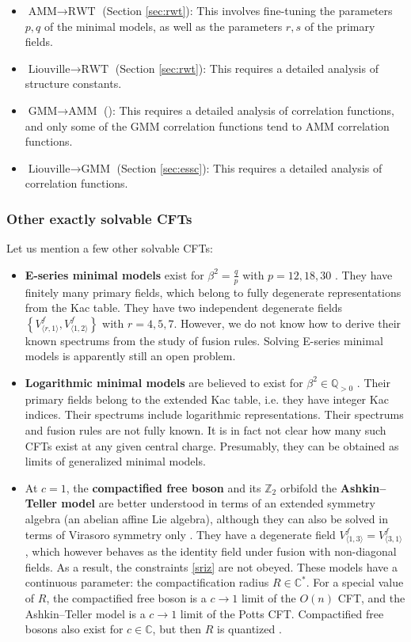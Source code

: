 \documentclass[12pt, a4paper]{article}
\theoremstyle{break}
\begin{document}
\begin{itemize}
 \item $\boxed{\text{AMM}\to \text{RWT}}$ (Section \ref{sec:rwt}): This involves fine-tuning the parameters $p,q$ of the minimal models, as well as the parameters $r,s$ of the primary fields.
  \item $\boxed{\text{Liouville}\to \text{RWT}}$ (Section \ref{sec:rwt}): This requires a detailed analysis of structure constants. 
 \item $\boxed{\text{GMM}\to \text{AMM}}$ (\cite{rib18}): This requires a detailed analysis of correlation functions, and only some of the GMM correlation functions tend to AMM correlation functions. 
 \item $\boxed{\text{Liouville}\to \text{GMM}}$ (Section \ref{sec:essc}): This requires a detailed analysis of correlation functions.
\end{itemize}

\subsubsection{Other exactly solvable CFTs}

Let us mention a few other solvable CFTs:
\begin{itemize}
 \item \textbf{E-series minimal models} exist for $\beta^2=\frac{q}{p}$ with $p=12, 18, 30$ \cite{fms97}. They have finitely many primary fields, which belong to fully degenerate representations from the Kac table. 
They have two independent degenerate fields $\left\{V^f_{\langle r,1\rangle},V^f_{\langle 1,2\rangle}\right\}$ with $r=4,5,7$. 
However, we do not know how to derive their known spectrums from the study of fusion rules. 
Solving E-series minimal models is apparently still an open problem. 
\item \textbf{Logarithmic minimal models} are believed to exist for $\beta^2\in \mathbb{Q}_{>0}$ \cite{prz06}. Their primary fields belong to the extended Kac table, i.e. they have integer Kac indices. Their spectrums include logarithmic representations. Their spectrums and fusion rules are not fully known. It is in fact not clear how many such CFTs exist at any given central charge. Presumably, they can be obtained as limits of generalized minimal models. 
\item At $c=1$, the \textbf{compactified free boson} and its $\mathbb{Z}_2$ orbifold the \textbf{Ashkin--Teller model} are better understood in terms of an extended symmetry algebra (an abelian affine Lie algebra), although they can also be solved in terms of Virasoro symmetry only \cite{nr21}. They have a degenerate field $V^f_{\langle 1, 3\rangle}=V^f_{\langle 3,1\rangle}$, which however behaves as the identity field under fusion with non-diagonal fields. As a result, the constraints \eqref{sriz} are not obeyed. These models have a continuous parameter: the compactification radius $R\in\mathbb{C}^*$. For a special value of $R$, the compactified free boson is a $c\to 1$ limit of the $O(n)$ CFT, and the Ashkin--Teller model is a $c\to 1$ limit of the Potts CFT. Compactified free bosons also exist for $c\in\mathbb{C}$, but then $R$ is quantized \cite{rib14}. 
\end{itemize}
\end{document}
